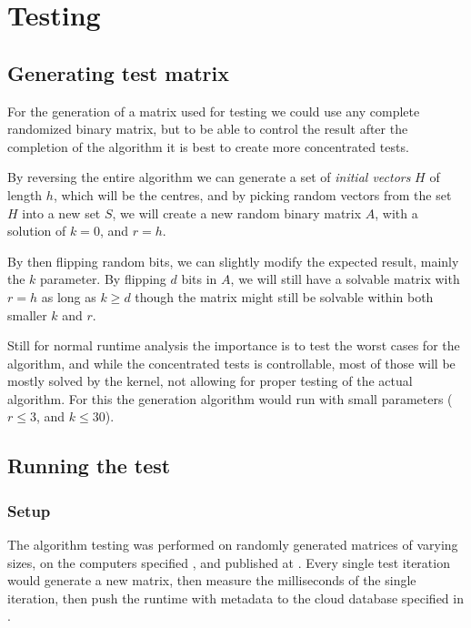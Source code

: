 \documentclass[a4paper]{article}
\begin{document}
%
%
\newpage

\section{Testing}
\label{sec:testing}
\subsection{Generating test matrix}
For the generation of a matrix used for testing we could use any complete randomized binary
matrix, but to be able to control the result after the completion of the algorithm it is best
to create more concentrated tests.

By reversing the entire algorithm we can generate a set of \textit{initial vectors} $H$ of length $h$,
which will be the centres, and by picking random vectors from the set $H$ into a new set $S$,
we will create a new random binary matrix $A$, with a solution of $k=0$, and $r=h$.

By then flipping random bits, we can slightly modify the expected result, mainly
the $k$ parameter. By flipping $d$ bits in $A$, we will still have a solvable matrix
with $r = h$ as long as $k \geq d$ though the matrix might still be solvable within both
smaller $k$ and $r$.



Still for normal runtime analysis the importance is to test the worst cases for the algorithm,
and while the concentrated tests is controllable, most of those will be mostly solved by the
kernel, not allowing for proper testing of the actual algorithm. For this the generation
algorithm would run with small parameters ($r \leq 3$, and $k \leq 30$).

\subsection{Running the test}
\subsubsection{Setup}
The algorithm testing was performed on randomly generated matrices of varying sizes, on the computers
specified , and published at \cite{datastudio_results}.
Every single test iteration would generate a new matrix, then measure the
milliseconds of the single iteration, then push the runtime with metadata to the cloud database specified
in .
\end{document}
